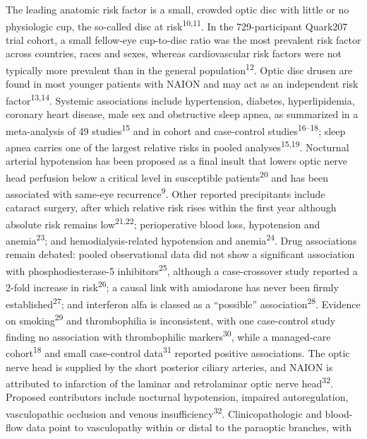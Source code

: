 \documentclass[
  11pt,
]{article}
\begin{document}
The leading anatomic risk factor is a small, crowded optic disc with
little or no physiologic cup, the so-called disc at
risk\textsuperscript{10,11}. In the 729-participant Quark207 trial
cohort, a small fellow-eye cup-to-disc ratio was the most prevalent risk
factor across countries, races and sexes, whereas cardiovascular risk
factors were not typically more prevalent than in the general
population\textsuperscript{12}. Optic disc drusen are found in most
younger patients with NAION and may act as an independent risk
factor\textsuperscript{13,14}. Systemic associations include
hypertension, diabetes, hyperlipidemia, coronary heart disease, male sex
and obstructive sleep apnea, as summarized in a meta-analysis of 49
studies\textsuperscript{15} and in cohort and case-control
studies\textsuperscript{16--18}; sleep apnea carries one of the largest
relative risks in pooled analyses\textsuperscript{15,19}. Nocturnal
arterial hypotension has been proposed as a final insult that lowers
optic nerve head perfusion below a critical level in susceptible
patients\textsuperscript{20} and has been associated with same-eye
recurrence\textsuperscript{9}. Other reported precipitants include
cataract surgery, after which relative risk rises within the first year
although absolute risk remains low\textsuperscript{21,22}; perioperative
blood loss, hypotension and anemia\textsuperscript{23}; and
hemodialysis-related hypotension and anemia\textsuperscript{24}. Drug
associations remain debated: pooled observational data did not show a
significant association with phosphodiesterase-5
inhibitors\textsuperscript{25}, although a case-crossover study reported
a 2-fold increase in risk\textsuperscript{26}; a causal link with
amiodarone has never been firmly established\textsuperscript{27}; and
interferon alfa is classed as a ``possible''
association\textsuperscript{28}. Evidence on smoking\textsuperscript{29}
and thrombophilia is inconsistent, with one case-control study finding
no association with thrombophilic markers\textsuperscript{30}, while a
managed-care cohort\textsuperscript{18} and small case-control
data\textsuperscript{31} reported positive associations. The optic nerve
head is supplied by the short posterior ciliary arteries, and NAION is
attributed to infarction of the laminar and retrolaminar optic nerve
head\textsuperscript{32}. Proposed contributors include nocturnal
hypotension, impaired autoregulation, vasculopathic occlusion and venous
insufficiency\textsuperscript{32}. Clinicopathologic and blood-flow data
point to vasculopathy within or distal to the paraoptic branches, with
\end{document}
